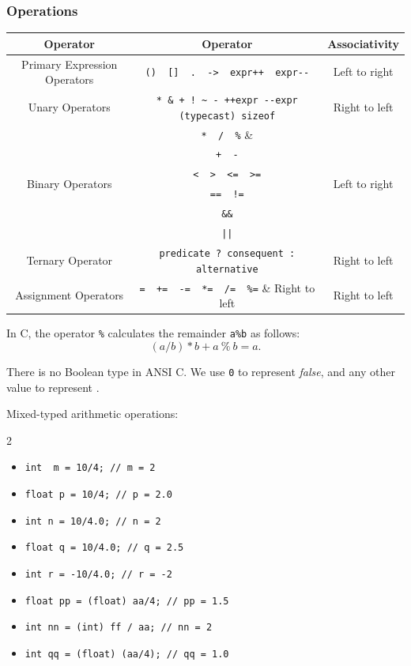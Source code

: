 \subsubsection{Operations}
\begin{tabular}{c c c}
  \toprule
  Operator & Operator & Associativity \\
  \midrule
  Primary Expression Operators & \verb|()  []  .  ->  expr++  expr--| & Left to right \\
  Unary Operators & \verb|* & + ! ~ - ++expr --expr (typecast) sizeof| & Right to left \\
  \multirow{6}{8em}{Binary Operators} & \verb|*  /  %| & \multirow{6}{5.3em}{Left to right} \\
   & \verb|+  -| &  \\
   & \verb|<  >  <=  >=| &  \\
   & \verb|==  !=| &  \\
   & \verb|&&| &  \\
   & \verb$||$ &  \\
  Ternary Operator & \verb|predicate ? consequent : alternative| & Right to left\\
  Assignment Operators & \verb|=  +=  -=  *=  /=  %=| & Right to left\\
  \bottomrule
\end{tabular}
\begin{remark}
  In C, the operator \verb|%| calculates the remainder \verb|a%b| as follows:
  \[\left(a/b\right)*b+a\ \%\ b=a.\] 
\end{remark}
\begin{remark}
  There is no Boolean type in ANSI C. We use \verb|0| to represent
  \textit{false}, and any other value to represent .
\end{remark}
Mixed-typed arithmetic operations:
\begin{multicols}{2}
\begin{itemize}
  \item \verb|int  m = 10/4; // m = 2|
  \item \verb|float p = 10/4; // p = 2.0|
  \item \verb|int n = 10/4.0; // n = 2|
  \item \verb|float q = 10/4.0; // q = 2.5|
\end{itemize}
\begin{itemize}
  \item \verb|int r = -10/4.0; // r = -2|
  \item \verb|float pp = (float) aa/4; // pp = 1.5|
  \item \verb|int nn = (int) ff / aa; // nn = 2|
  \item \verb|int qq = (float) (aa/4); // qq = 1.0|
\end{itemize}
\end{multicols}

